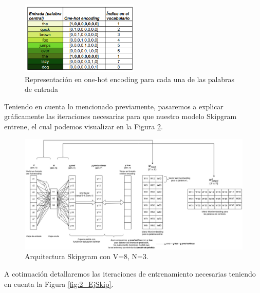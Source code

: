 \documentclass[12pt,a4paper]{article}
\begin{document}
\begin{sloppypar}
\begin{figure}[H]    %
\centering
\includegraphics[width=0.5\textwidth]{images/Ejemplo_Skipgram/3_EjSkip.png}
 \captionsetup{justification=centering,margin=3cm}
\caption{Representación en one-hot encoding para cada una de las palabras de entrada} 
\label{fig:3_EjSkip}
\end{figure}

Teniendo en cuenta lo mencionado previamente, pasaremos a explicar gráficamente las iteraciones necesarias para que nuestro modelo Skipgram entrene, el cual podemos visualizar en la  Figura \ref{fig:4_EjSkip}.

\begin{figure}[H]    %
\centering
\includegraphics[width=1\textwidth]{images/Ejemplo_Skipgram/4_EjSkip.png}
\caption{Arquitectura Skipgram con V=8, N=3.} 
\label{fig:4_EjSkip}
\end{figure}

A cotinuación detallaremos las iteraciones de entrenamiento necesarias teniendo en cuenta la Figura \ref{fig:2_EjSkip}. 

\begin{enumerate}
      

\end{enumerate}
\end{sloppypar}
\end{document}
